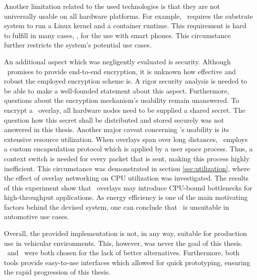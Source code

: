 Another limitation related to the used technologies is that they are not universally usable on all hardware platforms. For example, \docker\ requires the substrate system to run a Linux kernel and a container runtime. This requirement is hard to fulfill in many cases, \eg , for the use with smart phones. This circumstance further restricts the system's potential use cases.

An additional aspect which was negligently evaluated is security. Although \wnet\ promises to provide end-to-end encryption, it is unknown how effective and robust the employed encryption scheme is. A rigor security analysis is needed to be able to make a well-founded statement about this aspect. Furthermore, questions about the encryption mechanism's usability remain unanswered. To encrypt a \weave\ overlay, all hardware nodes need to be supplied a shared secret. The question how this secret shall be distributed and stored securely was not answered in this thesis. 
Another major caveat concerning \weave 's usability is its extensive resource utilization.  When overlays span over long distances, \weave\ employs a custom encapsulation protocol which is applied by a user space process. Thus, a context switch is needed for every packet that is sent, making this process highly inefficient. This circumstance was demonstrated in section \ref{sec:utilization}, where the effect of overlay networking on CPU utilization was investigated. The results of this experiment show that \weave\ overlays may introduce CPU-bound bottlenecks for high-throughput applications. As energy efficiency is one of the main motivating factors behind the devised system, one can conclude that \wnet\ is unsuitable in automotive use cases.

Overall, the provided implementation is not, in any way, suitable for production use in vehicular environments. This, however, was never the goal of this thesis. \wnet\ and \docker\ were both chosen for the lack of better alternatives. Furthermore, both tools provide easy-to-use interfaces which allowed for quick prototyping, ensuring the rapid progression of this thesis. 


